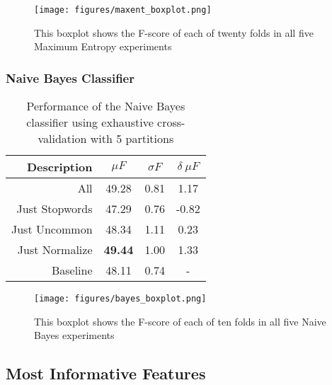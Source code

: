 \documentclass[final,3p,12pt]{elsarticle}
\begin{document}
\begin{figure}[H]
    \begin{center}
    \texttt{[image: figures/maxent\_boxplot.png]}
    \caption{This boxplot shows the F-score of each of twenty folds in all five
    Maximum Entropy experiments}
    \label{figure:maxent}
    \end{center}
\end{figure}

\subsubsection{Naive Bayes Classifier}

\begin{table}[H]
    \begin{center}
    \begin{tabular}{|r||c|c|c|}
        \hline
        Description    & $\mu F$ & $\sigma F$ & $\delta\ \mu F$ \\
        \hline
        All            & 49.28  & 0.81 &  1.17 \\
        Just Stopwords & 47.29  & 0.76 & -0.82 \\
        Just Uncommon  & 48.34  & 1.11 &  0.23 \\
        Just Normalize & \textbf{49.44} & 1.00 & 1.33\\
        Baseline       & 48.11  & 0.74 & - \\
        \hline
    \end{tabular}
    \end{center}
    \caption{Performance of the Naive Bayes classifier using exhaustive
    cross-validation with 5 partitions}
    \label{table:bayes-results}
\end{table}

\begin{figure}[H]
    \begin{center}
    \texttt{[image: figures/bayes\_boxplot.png]}
    \caption{This boxplot shows the F-score of each of ten folds in all five
    Naive Bayes experiments}
    \label{figure:bayes}
    \end{center}
\end{figure}


\subsection{Most Informative Features}
\label{ssection:informativefeatures}
\end{document}
